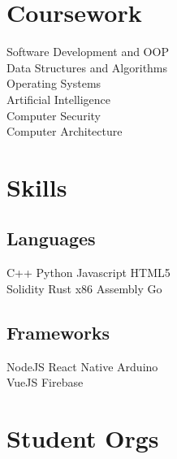 \documentclass[]{resume-openfont}
\begin{document}
\begin{minipage}[t]{0.33\textwidth}

\section{Coursework}
Software Development and OOP \\
Data Structures and Algorithms \\
Operating Systems \\
Artificial Intelligence \\
Computer Security \\
Computer Architecture \\
\sectionsep

\section{Skills}
\subsection{Languages}
C++ \textbullet{}  Python \textbullet{} Javascript \textbullet{} HTML5 \\
Solidity \textbullet{} Rust \textbullet{} x86 Assembly \textbullet{} Go\\

\vspace{5mm} %

\subsection{Frameworks}
NodeJS \textbullet{} React Native \textbullet{} Arduino \textbullet{} \\ VueJS \textbullet{} Firebase
\sectionsep


\section{Student Orgs}
\vspace{5mm}
\vspace{5mm}
\sectionsep


%
%

\end{minipage} 
\end{document}
